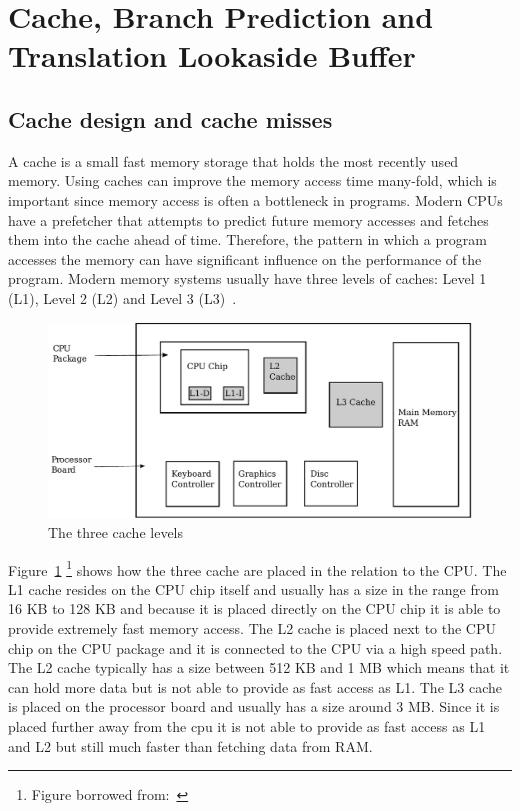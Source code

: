 \section{Cache, Branch Prediction and Translation Lookaside Buffer}

\subsection{Cache design and cache misses}
A cache is a small fast memory storage that holds the most recently used memory.
Using caches can improve the memory access time many-fold, which is important since memory access is often a bottleneck in programs.
Modern CPUs have a prefetcher that attempts to predict future memory accesses and fetches them into the cache ahead of time.
Therefore, the pattern in which a program accesses the memory can have significant influence on the performance of the program.
Modern memory systems usually have three levels of caches: Level 1 (L1), Level 2 (L2) and Level 3 (L3)~.

\begin{figure}
\includegraphics[width=\textwidth]{CacheLevels.pdf}
\caption{The three cache levels}
\label{fig:CacheLevels}
\end{figure}

Figure~\ref{fig:CacheLevels} \footnote{Figure borrowed from:~} shows how the three cache are placed in the relation to the CPU. 
The L1 cache resides on the CPU chip itself and usually has a size in the range from 16 KB to 128 KB and because it is placed directly on the CPU chip it is able to provide extremely fast memory access.
The L2 cache is placed next to the CPU chip on the CPU package and it is connected to the CPU via a high speed path. The L2 cache typically has a size between 512 KB and 1 MB which means that it can hold more data but is not able to provide as fast access as L1.
The L3 cache is placed on the processor board and usually has a size around 3 MB. 
Since it is placed further away from the cpu it is not able to provide as fast access as L1 and L2 but still much faster than fetching data from RAM.

